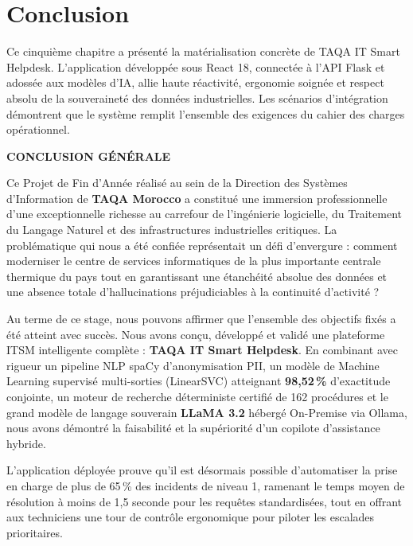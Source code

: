 \documentclass[12pt, a4paper, oneside]{report}
\begin{document}
\section{Conclusion}

Ce cinquième chapitre a présenté la matérialisation concrète de TAQA IT Smart Helpdesk. L'application développée sous React 18, connectée à l'API Flask et adossée aux modèles d'IA, allie haute réactivité, ergonomie soignée et respect absolu de la souveraineté des données industrielles. Les scénarios d'intégration démontrent que le système remplit l'ensemble des exigences du cahier des charges opérationnel.

\newpage
{}
\begin{flushright}
  \textbf{\Large CONCLUSION GÉNÉRALE}
\end{flushright}

\vspace{0.8cm}

Ce Projet de Fin d'Année réalisé au sein de la Direction des Systèmes d'Information de \textbf{TAQA Morocco} a constitué une immersion professionnelle d'une exceptionnelle richesse au carrefour de l'ingénierie logicielle, du Traitement du Langage Naturel et des infrastructures industrielles critiques. La problématique qui nous a été confiée représentait un défi d'envergure : comment moderniser le centre de services informatiques de la plus importante centrale thermique du pays tout en garantissant une étanchéité absolue des données et une absence totale d'hallucinations préjudiciables à la continuité d'activité ?

Au terme de ce stage, nous pouvons affirmer que l'ensemble des objectifs fixés a été atteint avec succès. Nous avons conçu, développé et validé une plateforme ITSM intelligente complète : \textbf{TAQA IT Smart Helpdesk}. En combinant avec rigueur un pipeline NLP spaCy d'anonymisation PII, un modèle de Machine Learning supervisé multi-sorties (LinearSVC) atteignant \textbf{98,52\,\%} d'exactitude conjointe, un moteur de recherche déterministe certifié de 162 procédures et le grand modèle de langage souverain \textbf{LLaMA 3.2} hébergé On-Premise via Ollama, nous avons démontré la faisabilité et la supériorité d'un copilote d'assistance hybride.

L'application déployée prouve qu'il est désormais possible d'automatiser la prise en charge de plus de 65\,\% des incidents de niveau 1, ramenant le temps moyen de résolution à moins de 1,5 seconde pour les requêtes standardisées, tout en offrant aux techniciens une tour de contrôle ergonomique pour piloter les escalades prioritaires.
\end{document}

